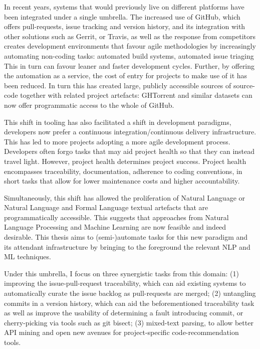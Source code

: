In recent years, systems that would previously live on different platforms have
been integrated under a single umbrella. The increased use of GitHub, which
offers pull-requests, issue tracking and version history, and its integration
with other solutions such as Gerrit, or Travis, as well as the response from
competitors creates development environments that favour agile methodologies by increasingly automating non-coding tasks: automated build systems, automated issue triaging \etc This in turn can favour leaner and faster development cycles. Further, by offering the automation as a service, the cost of entry for projects to make use of it has been reduced. In turn this has created large, publicly accessible sources of
source-code together with related project artefacts: GHTorrent and
similar datasets can now offer programmatic access to the whole of GitHub.

This shift in tooling has also facilitated a shift in development paradigms,
developers {now prefer} a continuous integration/continuous delivery
infrastructure. This has led to more projects adopting a more agile development
process. Developers often forgo tasks that may aid project health so that they
can instead travel light. However, project health determines project success.
Project health encompasses traceability, documentation, adherence to coding
conventions, in short tasks that allow for lower maintenance costs and higher
accountability.

Simultaneously, this shift has allowed the proliferation of Natural Language or
Natural Language and Formal Language textual artefacts that are
programmatically accessible. This suggests that approaches from Natural Language
Processing and Machine Learning are now feasible and indeed desirable. This
thesis aims to (semi-)automate tasks for this new paradigm and its attendant
infrastructure by bringing to the foreground the relevant NLP and ML techniques.

Under this umbrella, I focus on three synergistic tasks from this domain: (1)
improving the issue-pull-request traceability, which can aid existing systems to
automatically curate the issue backlog as pull-requests are merged; (2)
untangling commits in a version history, which can aid the beforementioned
traceability task as well as improve the usability of determining a fault
introducing commit, or cherry-picking via tools such as git bisect; (3)
mixed-text parsing, to allow better API mining and open new avenues for
project-specific code-recommendation tools.